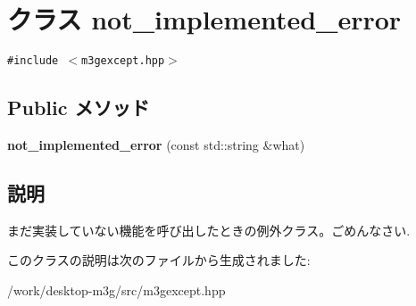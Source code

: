 \hypertarget{classm3g_1_1not__implemented__error}{
\section{クラス not\_\-implemented\_\-error}
\label{classm3g_1_1not__implemented__error}
}
{\tt \#include $<$m3gexcept.hpp$>$}

\subsection*{Public メソッド}
\begin{CompactItemize}
\item 
\hypertarget{classm3g_1_1not__implemented__error_2190a4bdd3d31c601366fe5a5ba6929e}{
\textbf{not\_\-implemented\_\-error} (const std::string \&what)}
\label{classm3g_1_1not__implemented__error_2190a4bdd3d31c601366fe5a5ba6929e}

\end{CompactItemize}


\subsection{説明}
まだ実装していない機能を呼び出したときの例外クラス。ごめんなさい. 

このクラスの説明は次のファイルから生成されました:\begin{CompactItemize}
\item 
/work/desktop-m3g/src/m3gexcept.hpp\end{CompactItemize}
